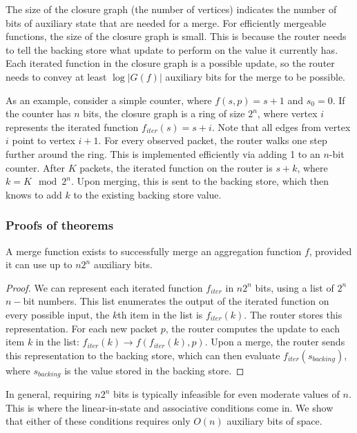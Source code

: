The size of the closure graph (\ie the number of vertices) indicates the number
of bits of auxiliary state that are needed for a merge. For efficiently
mergeable functions, the size of the closure graph is small. This is because
the router needs to tell the backing store what update to perform on the value
it currently has. Each iterated function in the closure graph is a possible
update, so the router needs to convey at least $\log |G(f)|$ auxiliary bits for
the merge to be possible.

As an example, consider a simple counter, where $f(s, p) = s + 1$ and $s_0 =
0$. If the counter has $n$ bits, the closure graph is a ring of size $2^n$,
where vertex $i$ represents the iterated function $f_{iter}(s) = s + i$. Note
that all edges from vertex $i$ point to vertex $i+1$. For every
observed packet, the router walks one step further around the ring. This is
implemented efficiently via adding 1 to an $n$-bit counter. After $K$ packets,
the iterated function on the router is $s + k$, where $k = K \mod 2^n$. Upon
merging, this is sent to the backing store, which then knows to add $k$ to the
existing backing store value.

\subsubsection{Proofs of theorems}
\label{ss:proofs}

\begin{theorem}
A merge function exists to successfully merge an aggregation function $f$,
provided it can use up to $n2^n$ auxiliary bits.
\end{theorem}
\begin{proof}
We can represent each iterated function $f_{iter}$ in $n2^n$ bits, using a list of
$2^n$ $n-$bit numbers. This list enumerates the output of the iterated function
on every possible input, \ie the $k$th item in the list is $f_{iter}(k)$. The router
stores this representation. For each new packet $p$, the router computes the
update to each item $k$ in the list: $f_{iter}(k) \rightarrow f(f_{iter}(k), p)$. Upon a
merge, the router sends this representation to the backing store, which can
then evaluate $f_{iter}(s_{backing})$, where $s_{backing}$ is the value stored in
the backing store.
\end{proof}

In general, requiring $n2^n$ bits is typically infeasible for even moderate values of $n$. This is where the linear-in-state and associative conditions come in. We show that either of these conditions requires only $O(n)$ auxiliary bits of space.

